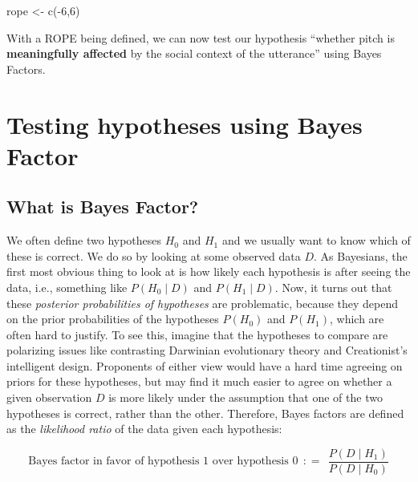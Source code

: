 \documentclass[
  doc,
  floatsintext,
  longtable,
  nolmodern,
  notxfonts,
  notimes,
  colorlinks=true,linkcolor=blue,citecolor=blue,urlcolor=blue]{apa7}
\newenvironment{Shaded}{\begin{snugshade}}{\end{snugshade}}
\newcommand{\DecValTok}[1]{\textcolor[rgb]{0.68,0.00,0.00}{#1}}
\newcommand{\FunctionTok}[1]{\textcolor[rgb]{0.28,0.35,0.67}{#1}}
\newcommand{\NormalTok}[1]{\textcolor[rgb]{0.00,0.23,0.31}{#1}}
\newcommand{\OtherTok}[1]{\textcolor[rgb]{0.00,0.23,0.31}{#1}}
\newcommand{\SpecialCharTok}[1]{\textcolor[rgb]{0.37,0.37,0.37}{#1}}
\begin{document}
\begin{Shaded}
\begin{Highlighting}[]
\NormalTok{rope }\OtherTok{\textless{}{-}} \FunctionTok{c}\NormalTok{(}\SpecialCharTok{{-}}\DecValTok{6}\NormalTok{,}\DecValTok{6}\NormalTok{)}
\end{Highlighting}
\end{Shaded}

With a ROPE being defined, we can now test our hypothesis ``whether
pitch is \textbf{meaningfully affected} by the social context of the
utterance'' using Bayes Factors.

\section{Testing hypotheses using Bayes
Factor}\label{testing-hypotheses-using-bayes-factor}

\subsection{What is Bayes Factor?}\label{what-is-bayes-factor}

We often define two hypotheses \(H_0\) and \(H_1\) and we usually want
to know which of these is correct. We do so by looking at some observed
data \(D\). As Bayesians, the first most obvious thing to look at is how
likely each hypothesis is after seeing the data, i.e., something like
\(P(H_0 \mid D)\) and \(P(H_1 \mid D)\). Now, it turns out that these
\emph{posterior probabilities of hypotheses} are problematic, because
they depend on the prior probabilities of the hypotheses \(P(H_0)\) and
\(P(H_1)\), which are often hard to justify. To see this, imagine that
the hypotheses to compare are polarizing issues like contrasting
Darwinian evolutionary theory and Creationist's intelligent design.
Proponents of either view would have a hard time agreeing on priors for
these hypotheses, but may find it much easier to agree on whether a
given observation \(D\) is more likely under the assumption that one of
the two hypotheses is correct, rather than the other. Therefore, Bayes
factors are defined as the \emph{likelihood ratio} of the data given
each hypothesis:

\[
\text{Bayes factor in favor of hypothesis 1 over hypothesis 0} \ \  \colon\!= \ \ \frac{P(D \mid H_1)}{P(D \mid H_0)}
\]
\end{document}
